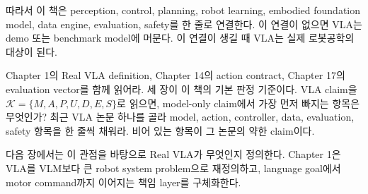 따라서 이 책은 perception, control, planning, robot learning, embodied foundation model, data engine, evaluation, safety를 한 줄로 연결한다. 이 연결이 없으면 VLA는 demo 또는 benchmark model에 머문다. 이 연결이 생길 때 VLA는 실제 로봇공학의 대상이 된다.

\chapterwork
{Chapter 1의 Real VLA definition, Chapter 14의 action contract, Chapter 17의 evaluation vector를 함께 읽어라. 세 장이 이 책의 기본 판정 기준이다.}
{VLA claim을 $\mathcal{K}=\{M,A,P,U,D,E,S\}$로 읽으면, model-only claim에서 가장 먼저 빠지는 항목은 무엇인가?}
{최근 VLA 논문 하나를 골라 model, action, controller, data, evaluation, safety 항목을 한 줄씩 채워라. 비어 있는 항목이 그 논문의 약한 claim이다.}

다음 장에서는 이 관점을 바탕으로 Real VLA가 무엇인지 정의한다. Chapter 1은 VLA를 VLM보다 큰 robot system problem으로 재정의하고, language goal에서 motor command까지 이어지는 책임 layer를 구체화한다.
